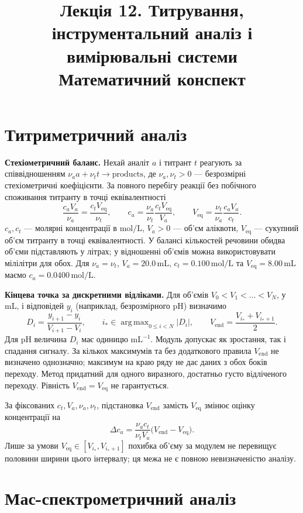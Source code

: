 \documentclass[11pt,a4paper]{article}
\title{Лекція 12. Титрування, інструментальний аналіз і вимірювальні системи\\[4pt]\large Математичний конспект}
\author{}
\date{}
\newcommand{\unit}[1]{\,\mathrm{#1}}
\newcommand{\eqv}{\mathrm{eq}}
\newcommand{\Vendpoint}{V_{\mathrm{end}}}
\begin{document}
\raggedright
\maketitle

\section{Титриметричний аналіз}

\textbf{Стехіометричний баланс.}
Нехай аналіт \(a\) і титрант \(t\) реагують за співвідношенням
\(\nu_a a+\nu_t t\to\mathrm{products}\), де \(\nu_a,\nu_t>0\) ---
безрозмірні стехіометричні коефіцієнти. За повного перебігу реакції
без побічного споживання титранту в точці еквівалентності
\[
  \frac{c_a V_a}{\nu_a}=\frac{c_t V_{\eqv}}{\nu_t},
  \qquad
  c_a=\frac{\nu_a}{\nu_t}\frac{c_t V_{\eqv}}{V_a},
  \qquad
  V_{\eqv}=\frac{\nu_t}{\nu_a}\frac{c_a V_a}{c_t}.
\]
\(c_a,c_t\) --- молярні концентрації в \(\mathrm{mol/L}\),
\(V_a>0\) --- об'єм аліквоти, \(V_{\eqv}\) --- сукупний об'єм
титранту в точці еквівалентності. У балансі кількостей речовини
обидва об'єми підставляють у літрах; у відношенні об'ємів
можна використовувати мілілітри для обох. Для \(\nu_a=\nu_t\),
\(V_a=20.0\unit{mL}\), \(c_t=0.100\unit{mol/L}\) та
\(V_{\eqv}=8.00\unit{mL}\) маємо \(c_a=0.0400\unit{mol/L}\).

\textbf{Кінцева точка за дискретними відліками.}
Для об'ємів \(V_0<V_1<\dots<V_N\), у \(\mathrm{mL}\), і
відповідей \(y_i\) (наприклад, безрозмірного pH) визначимо
\[
  D_i=\frac{y_{i+1}-y_i}{V_{i+1}-V_i},
  \qquad
  i_* \in \mathop{\mathrm{arg\,max}}_{0\le i<N}|D_i|,
  \qquad
  \Vendpoint=\frac{V_{i_*}+V_{i_*+1}}{2}.
\]
Для pH величина \(D_i\) має одиницю \(\mathrm{mL^{-1}}\).
Модуль допускає як зростання, так і спадання сигналу.
За кількох максимумів та без додаткового правила \(\Vendpoint\)
не визначено однозначно; максимум на краю ряду не дає даних
з обох боків переходу. Метод придатний для одного
виразного, достатньо густо відліченого переходу.
Рівність \(\Vendpoint=V_{\eqv}\) не гарантується.

За фіксованих \(c_t,V_a,\nu_a,\nu_t\), підстановка
\(\Vendpoint\) замість \(V_{\eqv}\) змінює оцінку концентрації на
\[
  \Delta c_a =
  \frac{\nu_a c_t}{\nu_t V_a}\bigl(\Vendpoint-V_{\eqv}\bigr).
\]
Лише за умови \(V_{\eqv}\in[V_{i_*},V_{i_*+1}]\) похибка
об'єму за модулем не перевищує половини ширини цього інтервалу;
ця межа не є повною невизначеністю аналізу.

\section{Мас-спектрометричний аналіз}
\end{document}

